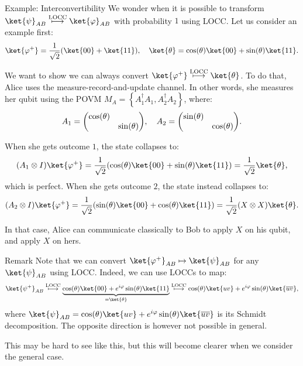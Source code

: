 \documentclass[a4paper]{article}
\begin{document}
\begin{parag}{Example: Interconvertibility}
    We wonder when it is possible to transform $\ket{\psi}_{AB} \over{\longmapsto}{LOCC}  \ket{\phi}_{AB}$ with probability $1$ using LOCC. Let us consider an example first: 
    \[\ket{\phi^+} = \frac{1}{\sqrt{2}}\left(\ket{00} + \ket{11}\right), \mathspace \ket{\theta} = \cos\left(\theta\right) \ket{00} + \sin\left(\theta\right) \ket{11}.\]

    We want to show we can always convert $\ket{\phi^+} \over{\longmapsto}{LOCC} \ket{\theta}$. To do that, Alice uses the measure-record-and-update channel. In other words, she measures her qubit using the POVM $M_A = \left\{A_1^{\dagger} A_1, A_2^{\dagger} A_2\right\}$, where: 
    \[A_1 = \begin{pmatrix} \cos\left(\theta\right) &  \\  & \sin\left(\theta\right) \end{pmatrix}, \mathspace A_2 = \begin{pmatrix} \sin\left(\theta\right) &  \\  & \cos\left(\theta\right) \end{pmatrix}.\]

    When she gets outcome $1$, the state collapses to: 
    \[\left(A_1 \otimes I\right) \ket{\phi^+} = \frac{1}{\sqrt{2}} \left(\cos\left(\theta\right) \ket{00} + \sin\left(\theta\right) \ket{11}\right) = \frac{1}{\sqrt{2}} \ket{\theta},\]
    which is perfect. When she gets outcome $2$, the state instead collapses to:
    \[\left(A_2 \otimes I\right) \ket{\phi^+} = \frac{1}{\sqrt{2}}\left(\sin\left(\theta\right) \ket{00} + \cos\left(\theta\right) \ket{11}\right) = \frac{1}{\sqrt{2}} \left(X \otimes X\right) \ket{\theta}.\]

    In that case, Alice can communicate classically to Bob to apply $X$ on his qubit, and apply $X$ on hers.

    \begin{subparag}{Remark}
        Note that we can convert $\ket{\phi^+}_{AB} \mapsto \ket{\psi}_{AB}$ for any $\ket{\psi}_{AB}$ using LOCC. Indeed, we can use LOCCs to map:
        \[\ket{\psi^+}_{AB} \over{\longmapsto}{LOCC} \underbrace{\cos\left(\theta\right) \ket{00} + e^{i\phi} \sin\left(\theta\right) \ket{11}}_{= \ket{\theta}} \over{\longmapsto}{LOCC}  \cos\left(\theta\right) \ket{uv} + e^{i \phi} \sin\left(\theta\right) \ket{\bar{u} \bar{v}},\]
        where $\ket{\psi}_{AB} = \cos\left(\theta\right) \ket{uv} + e^{i \phi} \sin\left(\theta\right) \ket{\bar{u} \bar{v}}$ is its Schmidt decomposition. The opposite direction is however not possible in general. 

        This may be hard to see like this, but this will become clearer when we consider the general case.
    \end{subparag}
\end{parag}
\end{document}
